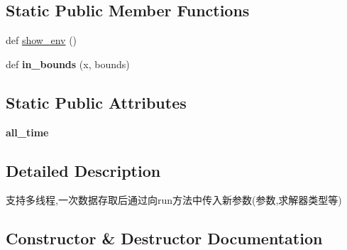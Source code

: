 \subsection*{Static Public Member Functions}
\begin{DoxyCompactItemize}
\item 
def \hyperlink{classMIS_1_1Muon__Imaging__Algorithm_1_1solver_1_1Solver_1_1Solver_aba542ec992f4439a203c5cd1ac63454a}{show\+\_\+env} ()
\item 
\mbox{\label{classMIS_1_1Muon__Imaging__Algorithm_1_1solver_1_1Solver_1_1Solver_a43712e147688d76885895709b4843010}} 
def {\bfseries in\+\_\+bounds} (x, bounds)
\end{DoxyCompactItemize}
\subsection*{Static Public Attributes}
\begin{DoxyCompactItemize}
\item 
\mbox{\label{classMIS_1_1Muon__Imaging__Algorithm_1_1solver_1_1Solver_1_1Solver_ab252e5a2bfad599714ed6e645d6dc379}} 
{\bfseries all\+\_\+time}
\end{DoxyCompactItemize}


\subsection{Detailed Description}
\begin{DoxyVerb}支持多线程,一次数据存取后通过向run方法中传入新参数(参数,求解器类型等)
\end{DoxyVerb}
 

\subsection{Constructor \& Destructor Documentation}
\mbox{\label{classMIS_1_1Muon__Imaging__Algorithm_1_1solver_1_1Solver_1_1Solver_a055e6cca9674d55c1a3fe2d390029a7b}} 
